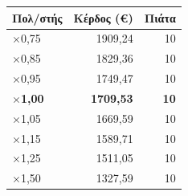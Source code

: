 \begin{tabular}{@{}lrr@{}}
\toprule
\textbf{Πολ/στής} & \textbf{Κέρδος (€)} & \textbf{Πιάτα} \\
\midrule
$\times$0,75 & 1909,24 & 10 \\
$\times$0,85 & 1829,36 & 10 \\
$\times$0,95 & 1749,47 & 10 \\
\bfseries $\times$1,00 & \bfseries 1709,53 & \bfseries 10 \\
$\times$1,05 & 1669,59 & 10 \\
$\times$1,15 & 1589,71 & 10 \\
$\times$1,25 & 1511,05 & 10 \\
$\times$1,50 & 1327,59 & 10 \\
\bottomrule
\end{tabular}
